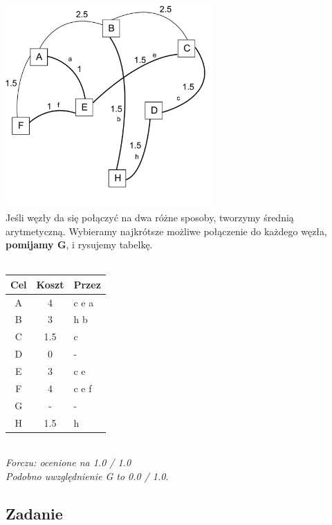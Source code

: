 \documentclass[a4paper,twoside]{article}
\begin{document}
\includegraphics[width=8.0cm]{./images/zadanie06.pdf}\\
Jeśli węzły da się połączyć na dwa różne sposoby, tworzymy średnią arytmetyczną. Wybieramy najkrótsze możliwe połączenie do każdego węzła, \textbf{pomijamy G}, i rysujemy tabelkę.\\\\ 
\begin{tabular}{c|c|l}
	Cel & Koszt & Przez \\ \hline
	A   & 4     & c e a \\
	B   & 3     & h b   \\
	C   & 1.5   & c     \\
	D   & 0     & -     \\
	E   & 3     & c e   \\
	F   & 4     & c e f \\
	G   & -     & -     \\
	H   & 1.5   & h     
\end{tabular}\\
\small{ \emph{Forczu: ocenione na 1.0 / 1.0\\
		Podobno uwzględnienie G to 0.0 / 1.0}}.
\subsection{Zadanie}
\end{document}
